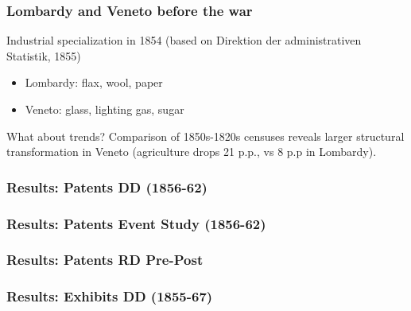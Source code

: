\documentclass[10pt]{beamer}
\begin{document}
\begin{frame}
    \frametitle{Lombardy and Veneto before the war}

    Industrial specialization in 1854 (based on Direktion der administrativen Statistik, 1855)
    \begin{itemize}
        \item Lombardy: flax, wool, paper
        \item Veneto: glass, lighting gas, sugar
    \end{itemize}

    \bigskip
    \pause
    
    What about trends? Comparison of 1850s-1820s censuses reveals larger structural transformation in Veneto (agriculture drops 21 p.p., vs 8 p.p in Lombardy).
  
\end{frame}


\begin{frame}
    \frametitle{Results: Patents DD (1856-62)}
    \centering
    \begin{minipage}{.75 \textwidth}
        
    \end{minipage}
    
\end{frame}

\begin{frame}
    \frametitle{Results: Patents Event Study (1856-62)}
    \centering
    \begin{minipage}{.75 \textwidth}
        
    \end{minipage}
\end{frame}

\begin{frame}
    \frametitle{Results: Patents RD Pre-Post}

    \centering
    \begin{minipage}{.75 \textwidth}
        
    \end{minipage}
    
\end{frame}

\begin{frame}
    \frametitle{Results: Exhibits DD (1855-67)}

    \centering
    \begin{minipage}{0.75 \textwidth}
        
    \end{minipage}
    
\end{frame}
\end{document}
